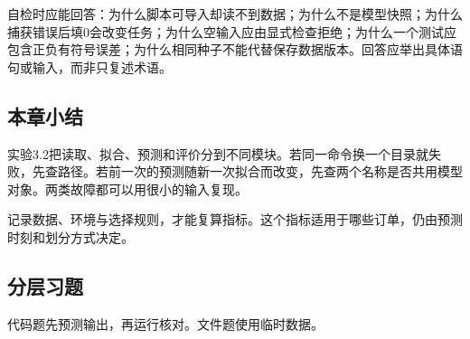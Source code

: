\documentclass[UTF8,fontset=none,zihao=-4,a4paper]{ctexart}
\newcommand{\code}[1]{\texttt{\detokenize{#1}}}
\numberwithin{equation}{section}
\numberwithin{figure}{section}
\begin{document}
自检时应能回答：为什么脚本可导入却读不到数据；为什么\code{b = a}不是模型快照；为什么捕获错误后填0会改变任务；为什么空输入应由显式检查拒绝；为什么一个测试应包含正负有符号误差；为什么相同种子不能代替保存数据版本。回答应举出具体语句或输入，而非只复述术语。

\subsection{本章小结}
实验3.2把读取、拟合、预测和评价分到不同模块。若同一命令换一个目录就失败，先查路径。若前一次的预测随新一次拟合而改变，先查两个名称是否共用模型对象。两类故障都可以用很小的输入复现。

记录数据、环境与选择规则，才能复算指标。这个指标适用于哪些订单，仍由预测时刻和划分方式决定。

\clearpage
\subsection{分层习题}
代码题先预测输出，再运行核对。文件题使用临时数据。
\end{document}
